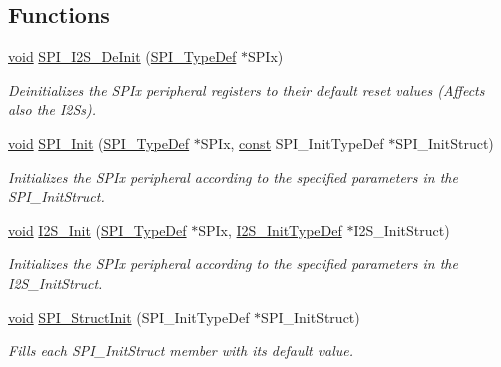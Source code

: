 \subsection*{Functions}
\begin{DoxyCompactItemize}
\item 
\hyperlink{group___n_a_m_e_ga18028b8badbf1ea7e704ccac3c488e82}{void} \hyperlink{group___s_p_i___private___functions_gabe36880945fa56785283a9c0092124cc}{S\-P\-I\-\_\-\-I2\-S\-\_\-\-De\-Init} (\hyperlink{struct_s_p_i___type_def}{S\-P\-I\-\_\-\-Type\-Def} $\ast$S\-P\-Ix)
\begin{DoxyCompactList}\small\item\em Deinitializes the S\-P\-Ix peripheral registers to their default reset values (Affects also the I2\-Ss). \end{DoxyCompactList}\item 
\hyperlink{group___n_a_m_e_ga18028b8badbf1ea7e704ccac3c488e82}{void} \hyperlink{group___s_p_i___private___functions_ga3a2cbcf27cb1b160f6ef8fce23eff88c}{S\-P\-I\-\_\-\-Init} (\hyperlink{struct_s_p_i___type_def}{S\-P\-I\-\_\-\-Type\-Def} $\ast$S\-P\-Ix, \hyperlink{group___n_a_m_e_ga7ae6d0e43244213b34de2c2b9aa30da6}{const} S\-P\-I\-\_\-\-Init\-Type\-Def $\ast$S\-P\-I\-\_\-\-Init\-Struct)
\begin{DoxyCompactList}\small\item\em Initializes the S\-P\-Ix peripheral according to the specified parameters in the S\-P\-I\-\_\-\-Init\-Struct. \end{DoxyCompactList}\item 
\hyperlink{group___n_a_m_e_ga18028b8badbf1ea7e704ccac3c488e82}{void} \hyperlink{group___s_p_i___private___functions_ga53661884ae4a9640df7cbc59187782f7}{I2\-S\-\_\-\-Init} (\hyperlink{struct_s_p_i___type_def}{S\-P\-I\-\_\-\-Type\-Def} $\ast$S\-P\-Ix, \hyperlink{struct_i2_s___init_type_def}{I2\-S\-\_\-\-Init\-Type\-Def} $\ast$I2\-S\-\_\-\-Init\-Struct)
\begin{DoxyCompactList}\small\item\em Initializes the S\-P\-Ix peripheral according to the specified parameters in the I2\-S\-\_\-\-Init\-Struct. \end{DoxyCompactList}\item 
\hyperlink{group___n_a_m_e_ga18028b8badbf1ea7e704ccac3c488e82}{void} \hyperlink{group___s_p_i___private___functions_ga9a0116f88cc2c4478c270f05608703f1}{S\-P\-I\-\_\-\-Struct\-Init} (S\-P\-I\-\_\-\-Init\-Type\-Def $\ast$S\-P\-I\-\_\-\-Init\-Struct)
\begin{DoxyCompactList}\small\item\em Fills each S\-P\-I\-\_\-\-Init\-Struct member with its default value. \end{DoxyCompactList}\item 

\end{DoxyCompactItemize}
